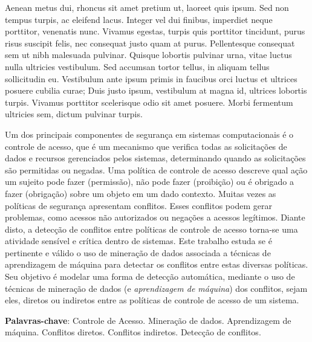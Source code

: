 Aenean metus dui, rhoncus sit amet pretium ut, laoreet quis ipsum. Sed non tempus turpis, ac eleifend lacus. Integer vel dui finibus, imperdiet neque porttitor, venenatis nunc. Vivamus egestas, turpis quis porttitor tincidunt, purus risus suscipit felis, nec consequat justo quam at purus. Pellentesque consequat sem ut nibh malesuada pulvinar. Quisque lobortis pulvinar urna, vitae luctus nulla ultricies vestibulum. Sed accumsan tortor tellus, in aliquam tellus sollicitudin eu. Vestibulum ante ipsum primis in faucibus orci luctus et ultrices posuere cubilia curae; Duis justo ipsum, vestibulum at magna id, ultrices lobortis turpis. Vivamus porttitor scelerisque odio sit amet posuere. Morbi fermentum ultricies sem, dictum pulvinar turpis. 

\begin{resumo}

  Um dos principais componentes de segurança em sistemas computacionais é o controle de acesso, que é um mecanismo que verifica todas as solicitações de dados e recursos gerenciados pelos sistemas, determinando quando as solicitações são permitidas ou negadas. Uma política de controle de acesso descreve qual  ação um sujeito pode fazer (permissão), não pode fazer (proibição) ou é obrigado a fazer (obrigação) sobre um objeto em um dado contexto. Muitas vezes as políticas de segurança apresentam conflitos. Esses conflitos podem gerar problemas, como acessos não autorizados ou negações a acessos legítimos. Diante disto, a detecção de conflitos entre políticas de controle de acesso torna-se uma atividade sensível e crítica dentro de sistemas. Este trabalho estuda se é pertinente e válido o uso de mineração de dados associada a técnicas de aprendizagem de máquina para detectar os conflitos entre estas diversas políticas. Seu objetivo é modelar uma forma de detecção automática, mediante o uso de técnicas de mineração de dados (e \textit{aprendizagem de máquina}) dos conflitos, sejam eles, diretos ou indiretos entre as políticas de controle de acesso de um sistema.

{\hspace{-8mm} \bf{Palavras-chave}}: Controle de Acesso. Mineração de dados. Aprendizagem de máquina. Conflitos diretos. Conflitos indiretos. Detecção de conflitos.

\end{resumo}

